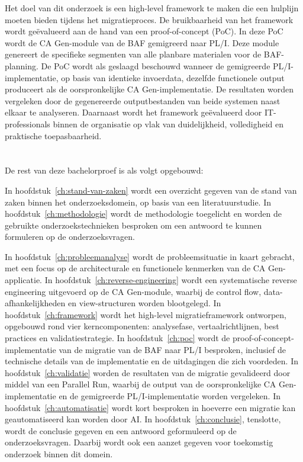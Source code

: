 Het doel van dit onderzoek is een high-level framework te maken die een hulplijn moeten bieden tijdens het 
migratieproces. De bruikbaarheid van het framework wordt geëvalueerd aan de hand van een proof-of-concept (PoC). 
In deze PoC wordt de CA Gen-module van de BAF gemigreerd naar PL/I. Deze module genereert de specifieke segmenten 
van alle planbare materialen voor de BAF-planning.
De PoC wordt als geslaagd beschouwd wanneer de gemigreerde PL/I-implementatie, op basis van identieke 
invoerdata, dezelfde functionele output produceert als de oorspronkelijke CA Gen-implementatie. De resultaten 
worden vergeleken door de gegenereerde outputbestanden van beide systemen naast elkaar te 
analyseren.
Daarnaast wordt het framework geëvalueerd door IT-professionals binnen de organisatie op vlak van duidelijkheid, 
volledigheid en praktische toepasbaarheid.

\section{}%
\label{sec:opzet-bachelorproef}


De rest van deze bachelorproef is als volgt opgebouwd:

In hoofdstuk~\ref{ch:stand-van-zaken} wordt een overzicht gegeven van de stand van zaken binnen het onderzoeksdomein, 
op basis van een literatuurstudie.
In hoofdstuk~\ref{ch:methodologie} wordt de methodologie toegelicht en worden de gebruikte onderzoekstechnieken 
besproken om een antwoord te kunnen formuleren op de onderzoeksvragen.

In hoofdstuk~\ref{ch:probleemanalyse} wordt de probleemsituatie in kaart gebracht, met een focus op de
architecturale en functionele kenmerken van de CA Gen-applicatie.   
In hoofdstuk~\ref{ch:reverse-engineering} wordt een systematische reverse engineering uitgevoerd op de
CA Gen-module, waarbij de control flow, data-afhankelijkheden en view-structuren worden blootgelegd.
In hoofdstuk~\ref{ch:framework} wordt het high-level migratieframework ontworpen, opgebouwd rond vier 
kerncomponenten: analysefase, vertaalrichtlijnen, best practices en validatiestrategie.
In hoofdstuk~\ref{ch:poc} wordt de proof-of-concept-implementatie van de migratie van de BAF naar PL/I
besproken, inclusief de technische details van de implementatie en de uitdagingen die zich voordeden.
In hoofdstuk~\ref{ch:validatie} worden de resultaten van de migratie gevalideerd door middel van een Parallel Run,
waarbij de output van de oorspronkelijke CA Gen-implementatie en de gemigreerde PL/I-implementatie worden vergeleken.
In hoofdstuk~\ref{ch:automatisatie} wordt kort besproken in hoeverre een migratie kan geautomatiseerd kan worden door AI.
In hoofdstuk~\ref{ch:conclusie}, tenslotte, wordt de conclusie gegeven en een antwoord geformuleerd op de 
onderzoeksvragen. Daarbij wordt ook een aanzet gegeven voor toekomstig onderzoek binnen dit domein.